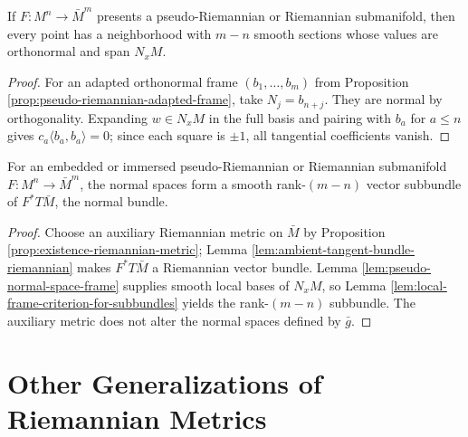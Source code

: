 \begin{lemma}
\label{lem:pseudo-normal-space-frame}
\leanok
{}
If $F:M^n\to\bar M^m$ presents a pseudo-Riemannian or Riemannian submanifold, then every point has a neighborhood with $m-n$ smooth sections whose values are orthonormal and span $N_xM$.
\end{lemma}
\begin{proof}
\leanok
{}
\sketch For an adapted orthonormal frame $(b_1,\ldots,b_m)$ from Proposition \ref{prop:pseudo-riemannian-adapted-frame}, take $N_j=b_{n+j}$. They are normal by orthogonality. Expanding $w\in N_xM$ in the full basis and pairing with $b_a$ for $a\le n$ gives $c_a\langle b_a,b_a\rangle=0$; since each square is $\pm1$, all tangential coefficients vanish.
\end{proof}

\begin{corollary}
\label{cor:normal-bundle-pseudo-riemannian-submanifold}
\leanok
{}
For an embedded or immersed pseudo-Riemannian or Riemannian submanifold $F:M^n\to\bar M^m$, the normal spaces form a smooth rank-$(m-n)$ vector subbundle of $F^*T\bar M$, the normal bundle.
\end{corollary}
\begin{proof}
\leanok
{}
\sketch Choose an auxiliary Riemannian metric on $\bar M$ by Proposition \ref{prop:existence-riemannian-metric}; Lemma \ref{lem:ambient-tangent-bundle-riemannian} makes $F^*T\bar M$ a Riemannian vector bundle. Lemma \ref{lem:pseudo-normal-space-frame} supplies smooth local bases of $N_xM$, so Lemma \ref{lem:local-frame-criterion-for-subbundles} yields the rank-$(m-n)$ subbundle. The auxiliary metric does not alter the normal spaces defined by $\bar g$.
\end{proof}

\section{Other Generalizations of Riemannian Metrics}

